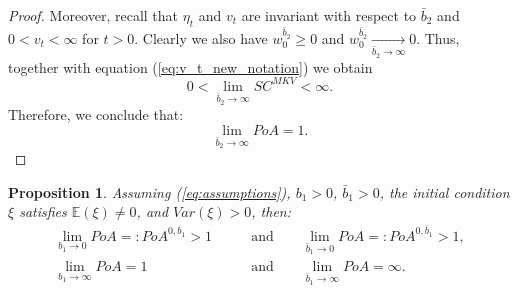 \documentclass[11pt]{article}
\newtheorem{proposition}{Proposition}
\begin{document}
\begin{proof}
	Moreover, recall that $\eta_t$ and $v_t$ are invariant with respect to $\bar{b}_2$ and $0<v_t<\infty$ for $t>0$. Clearly we also have $w^{\bar{b}_2}_0 \geq 0$ and $w^{\bar{b}_2}_0 \xrightarrow[\bar{b}_2 \to \infty]{} 0$. Thus, together with equation (\ref{eq:v_t_new_notation}) we obtain
	$$0< \lim_{\bar{b}_2 \to \infty} SC^{MKV} <\infty.$$
	Therefore, we conclude that:
	$$ \lim_{\bar{b}_2 \to \infty} PoA = 1.$$
\end{proof}





\begin{proposition}\label{prop:b1_b1bar}
	Assuming (\ref{eq:assumptions}), $b_1>0$, $\bar{b}_1>0$, the initial condition $\xi$ satisfies $\mathbb{E}(\xi)\neq 0$, and $Var(\xi)>0$, then:
	\begin{equation*}
	\begin{split}
	    \lim_{b_1 \to 0} PoA =: PoA^{0,b_1} > 1\qquad &\text{and} \qquad \lim_{\bar{b}_1 \to 0} PoA =: PoA^{0,\bar{b}_1} > 1,\\
	    \lim_{b_1 \to \infty} PoA = 1 \qquad &\text{and} \qquad\lim_{\bar{b}_1 \to \infty} PoA =\infty.
	\end{split}
	\end{equation*}
\end{proposition}
\end{document}
